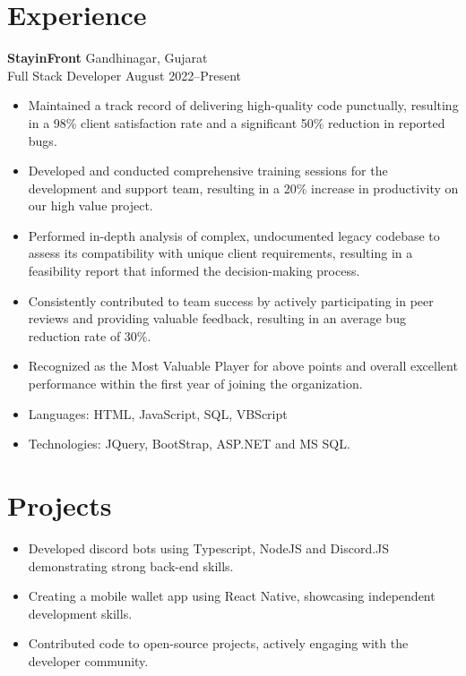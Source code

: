 \documentclass[a4paper,10pt]{article}
\begin{document}
\section{Experience}
\noindent
\textbf{StayinFront} \hfill Gandhinagar, Gujarat \\
Full Stack Developer \hfill August 2022--Present \
\begin{itemize}
    \setlength\itemsep{0.1pt}
    \item Maintained a track record of delivering high-quality code punctually, resulting in a 98\% client satisfaction rate and a significant 50\% reduction in reported bugs.
    \item Developed and conducted comprehensive training sessions for the development and support team, resulting in a 20\% increase in productivity on our high value project.
    \item Performed in-depth analysis of complex, undocumented legacy codebase to assess its compatibility with unique client requirements, resulting in a feasibility report that informed the decision-making process.
    \item Consistently contributed to team success by actively participating in peer reviews and providing valuable feedback, resulting in an average bug reduction rate of 30\%.
    \item Recognized as the Most Valuable Player for above points and overall excellent performance within the first year of joining the organization.
    \item Languages: HTML, JavaScript, SQL, VBScript
    \item Technologies: JQuery, BootStrap, ASP.NET and MS SQL\@.
\end{itemize}

\section{Projects}
\begin{itemize}
    \setlength\itemsep{0.1pt}
    \item Developed discord bots using Typescript, NodeJS and Discord.JS demonstrating strong back-end skills.
    \item Creating a mobile wallet app using React Native, showcasing independent development skills.
    \item Contributed code to open-source projects, actively engaging with the developer community.
\end{itemize}
\end{document}

